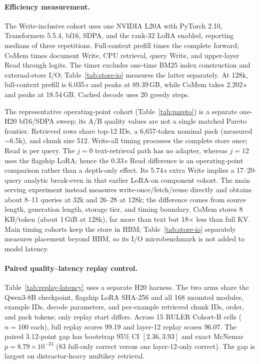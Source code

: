\paragraph{Efficiency measurement.}
\label{app:efficiency}
The Write-inclusive cohort uses one NVIDIA L20A with PyTorch 2.10,
Transformers 5.5.4, bf16, SDPA, and the rank-32 LoRA enabled, reporting medians
of three repetitions. Full-context prefill times the complete forward; CoMem
times document Write, CPU retrieval, query Write, and upper-layer Read through
logits. The timer excludes one-time BM25 index construction and external-store
I/O; Table~\ref{tab:store-io} measures the latter separately. At 128k,
full-context prefill is 6.035\,s and peaks at 89.39\,GB, while CoMem takes
2.202\,s and peaks at 18.54\,GB. Cached decode uses 20 greedy steps.

The representative operating-point cohort (Table~\ref{tab:pareto}) is a
separate one-H20 bf16/SDPA sweep; its A/B quality values are not a single matched
Pareto frontier. Retrieved rows share top-12 IDs, a 6,657-token nominal pack
(measured $\sim$6.5k), and chunk size 512. Write-all timing processes the complete store once; Read is
per query. The $j{=}0$ text-retrieval path has no adapter, whereas $j{=}12$ uses
the flagship LoRA; hence the 0.33\,s Read difference is an operating-point
comparison rather than a depth-only effect. Its 5.74\,s extra Write implies a
17--20-query analytic break-even in that earlier LoRA-on component cohort.
The main serving experiment instead measures write-once/fetch/reuse directly
and obtains about 8--11 queries at 32k and 26--28 at 128k; the difference comes
from source length, generation length, storage tier, and timing boundary.
CoMem stores 8\,KB/token (about
1\,GiB at 128k), far more than text but 18$\times$ less than full KV. Main timing
cohorts keep the store in HBM; Table~\ref{tab:store-io} separately measures
placement beyond HBM, so its I/O microbenchmark is not added to model latency.



\paragraph{Paired quality--latency replay control.}
Table~\ref{tab:replay-latency} uses a separate H20 harness. The two arms share
the Qwen3-8B checkpoint, flagship LoRA SHA-256 and all 168 mounted modules,
example IDs, decode parameters, and per-example retrieved chunk IDs, order, and
pack tokens; only replay start differs. Across 15 RULER Cohort-B cells
($n{=}100$ each), full replay scores 99.19 and layer-12 replay scores 96.07.
The paired 3.12-point gap has bootstrap 95\% CI $[2.36,3.93]$ and exact McNemar
$p{=}8.79\!\times\!10^{-24}$ (83 full-only correct versus one layer-12-only
correct). The gap is largest on distractor-heavy multikey retrieval.

